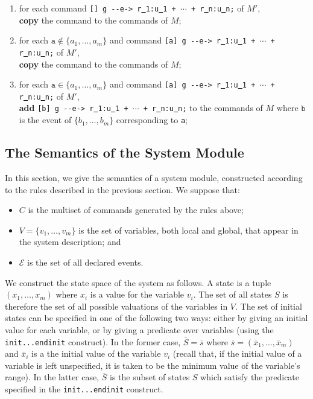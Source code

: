 \documentclass{article}
\newcommand{\arci}[1]{{-}{-}{#1}->}
\newcommand{\calE}{\mathcal{E}}
\renewcommand{\_}{\underline{~}}
\newcommand{\events}{{\calE}}
\newcommand{\code}[1]{\texttt{#1}}
\begin{document}
\begin{enumerate}
	
    \item for each command \code{[] g \arci{e} r\_1:u\_1 + $\cdots$ + r\_n:u\_n;} of $M'$, \\ 
    \textbf{copy} the command to the commands of $M$;

    \item for each $\code{a} \not\in \{a_1,\ldots,a_m\}$ and command \code{[a] g \arci{e}  r\_1:u\_1 + $\cdots$ + r\_n:u\_n;} of $M'$, \\ 
    \textbf{copy} the command to the commands of $M$;

    \item for each $\code{a} \in \{a_1,\ldots,a_m\}$ and command \code{[a] g \arci{e}  r\_1:u\_1 + $\cdots$ + r\_n:u\_n;} of $M'$, \\
    \textbf{add} \code{[b] g \arci{e}  r\_1:u\_1 + $\cdots$ + r\_n:u\_n;} to the commands of $M$ where $\code{b}$ is the event of $\{b_1,\ldots,b_m\}$ corresponding to \code{a};

\end{enumerate}

\subsection*{The Semantics of the System Module}
In this section, we give the semantics of a system module, constructed according to the rules described in the previous section.
We suppose that:
\begin{itemize}
	\item $C$ is the multiset of commands generated by the rules above;
	\item $V = \{v_1, \ldots , v_m\}$ is the set of variables, both local and global, that appear in the system description; and
	\item $\events$ is the set of all declared events.
\end{itemize}

We construct the state space of the system as follows. 
A state is a tuple $(x_1, \ldots , x_m)$ where $x_i$ is a value for the variable $v_i$. 
The set of all states $S$ is therefore the set of all possible valuations of the variables in $V$. 
The set of initial states can be specified in one of the following two ways: either by giving an initial value for each variable, or by giving a predicate over variables (using the \code{init...endinit} construct). 
In the former case, $\overline{S} = \overline{s}$ where $\overline{s} = (\overline{x}_1, \ldots , \overline{x}_m)$ and $\overline{x}_i$ is a the initial value of the variable $v_i$ (recall that, if the initial value of a variable is left unspecified, it is taken to be the minimum value of the variable’s range). 
In the latter case, $\overline{S}$ is the subset of states $S$ which satisfy the
predicate specified in the \code{init...endinit} construct.
\end{document}

